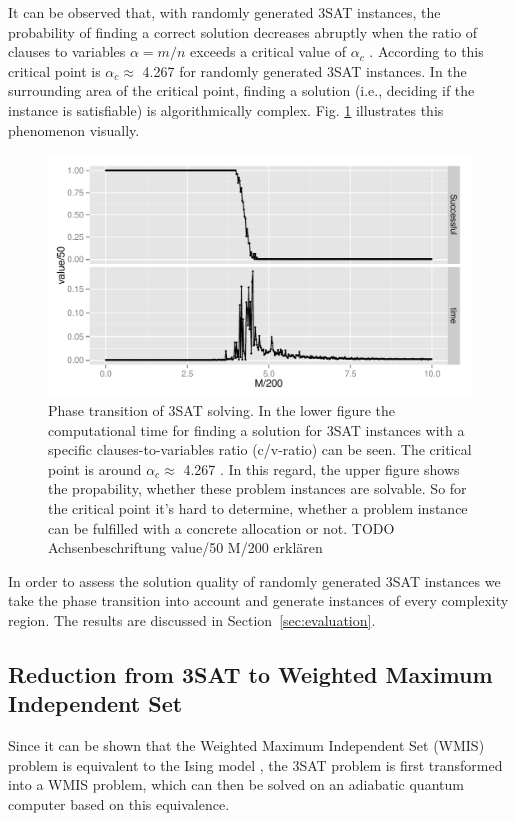 It can be observed that, with randomly generated 3SAT instances, the probability of finding a correct solution decreases abruptly when the ratio of clauses to variables $\alpha = m/n$ exceeds a critical value of $\alpha_{c}$ \cite{monasson1996entropy}. According to \cite{mezard2002random} this critical point is $\alpha_{c} \approx $ 4.267 for randomly generated 3SAT instances. In the surrounding area of the critical point, finding a solution (i.e., deciding if the instance is satisfiable) is algorithmically complex. Fig. \ref{fig:crit_sat} illustrates this phenomenon visually.

\begin{figure}
	\centering
	\includegraphics[width=.8\textwidth]{../material_2/plot_sat.pdf}
	\caption{Phase transition of 3SAT solving. In the lower figure the computational time for finding a solution for 3SAT instances with a specific clauses-to-variables ratio (c/v-ratio) can be seen. The critical point is around $\alpha_{c} \approx $ 4.267 . In this regard, the upper figure shows the propability, whether these problem instances are solvable. So for the critical point it's hard to determine, whether a problem instance can be fulfilled with a concrete allocation or not. TODO Achsenbeschriftung value/50 M/200 erklären} \label{fig:crit_sat}
\end{figure}

In order to assess the solution quality of randomly generated 3SAT instances we take the phase transition into account
and generate instances of every complexity region. The results are discussed in Section~\ref{sec:evaluation}.

\subsection{Reduction from 3SAT to Weighted Maximum Independent Set}
Since it can be shown that the Weighted Maximum Independent Set (WMIS) problem is equivalent to the Ising model \cite{choi2008minor}, the 3SAT problem is first transformed into a WMIS problem, which can then be solved on an adiabatic quantum computer based on this equivalence.\\

